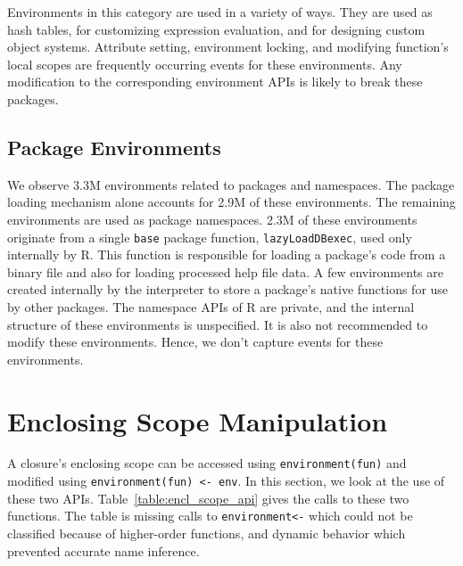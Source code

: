 \documentclass[10pt,review,sigplan,authorversion=true]{acmart}
\newcommand{\code}[1]{\lstinline |#1|\xspace}
\renewcommand{\c}[1]{\lstinline |#1|\xspace}
\begin{document}
Environments in this category are used in a variety of ways. They are used as
hash tables, for customizing expression evaluation, and for designing custom
object systems. Attribute setting, environment locking, and modifying function's
local scopes are frequently occurring events for these environments. Any
modification to the corresponding environment APIs is likely to break these
packages.


\subsection{Package Environments}

We observe 3.3M environments related to packages and namespaces. The package
loading mechanism alone accounts for 2.9M of these environments. The remaining
environments are used as package namespaces. 2.3M of these environments
originate from a single \code{base} package function, \code{lazyLoadDBexec},
used only internally by R. This function is responsible for loading a package's
code from a binary file and also for loading processed help file data. A few
environments are created internally by the interpreter to store a package's
native functions for use by other packages. The namespace APIs of R are private,
and the internal structure of these environments is unspecified. It is also not
recommended to modify these environments. Hence, we don't capture events for
these environments.

\section{Enclosing Scope Manipulation}

A closure's enclosing scope can be accessed using \c{environment(fun)} and
modified using \c{environment(fun) <- env}. In this section, we look at the use
of these two APIs. Table~\ref{table:encl_scope_api} gives the calls to these two
functions. The table is missing \EnvAsnUnclassifiedCallPerc calls to
\c{environment<-} which could not be classified because of higher-order
functions, and dynamic behavior which prevented accurate name inference.
\end{document}
